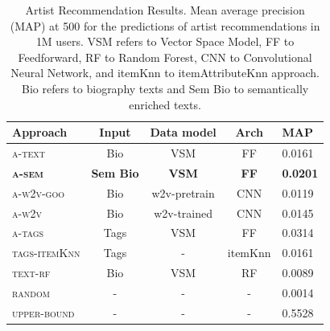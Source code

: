 \begin{table}
\centering
\label{tbl:artists}
\begin{tabular}{lcccl}
\toprule
\textbf{Approach} & \textbf{Input}   & \textbf{Data model} & \textbf{Arch} & \textbf{MAP} \\ \midrule
\textsc{a-text}                                   & Bio              & VSM                 & FF            & 0.0161                            \\ 
\textbf{\textsc{a-sem}}                           & \textbf{Sem Bio} & \textbf{VSM}        & \textbf{FF}   & \textbf{0.0201}                   \\
\textsc{a-w2v-goo}                                & Bio              & w2v-pretrain        & CNN           & 0.0119                            \\ 
\textsc{a-w2v}                                    & Bio              & w2v-trained         & CNN           & 0.0145                            \\ \midrule
\textsc{a-tags}                                   & Tags             & VSM                 & FF            & 0.0314                            \\ 
\textsc{tags-itemKnn}                                   & Tags             & -                 & itemKnn            & 0.0161                            \\ 
\textsc{text-rf}                                & Bio              & VSM                 & RF            & 0.0089                            \\ \midrule
\textsc{random}                                 & -                & -                   & -             & 0.0014                            \\
\textsc{upper-bound}                            & -                & -                   & -             & 0.5528                            \\ \bottomrule
\end{tabular}
\caption[Artist Recommendation Results.]{Artist Recommendation Results. Mean average precision (MAP) at 500 for the predictions of artist recommendations in 1M users. VSM refers to Vector Space Model, FF to Feedforward, RF to Random Forest, CNN to Convolutional Neural Network, and itemKnn to itemAttributeKnn approach. Bio refers to biography texts and Sem Bio to semantically enriched texts.}
\end{table}

